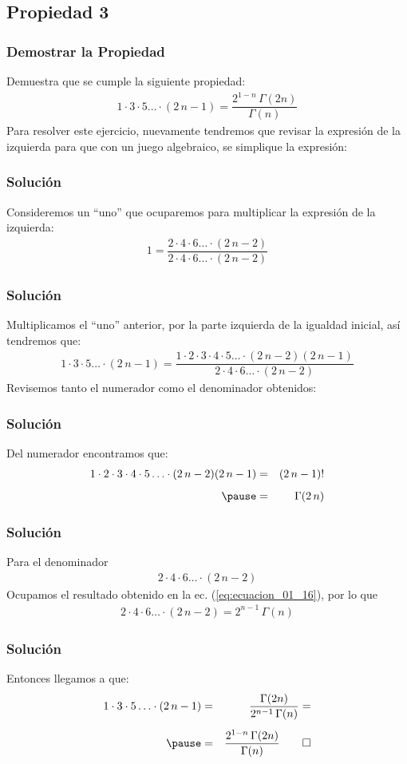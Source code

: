\subsection{Propiedad 3}
\begin{frame}
\frametitle{Demostrar la Propiedad}
Demuestra que se cumple la siguiente propiedad:
\begin{align*}
1 \cdot 3 \cdot 5 \ldots \cdot (2 \, n - 1) = \dfrac{2^{1-n} \, \Gamma (2 n)}{\Gamma (n)}
\end{align*}
\pause
Para resolver este ejercicio, nuevamente tendremos que revisar la expresión de la izquierda para que con un juego algebraico, se simplique la expresión:
\end{frame}
\begin{frame}
\frametitle{Solución}
Consideremos un \enquote{uno} que ocuparemos para multiplicar la expresión de la izquierda:
\begin{align*}
1 = \dfrac{ 2 \cdot 4 \cdot 6 \ldots \cdot (2 \, n - 2)}{ 2 \cdot 4 \cdot 6 \ldots \cdot (2 \, n - 2)}
\end{align*}
\end{frame}
\begin{frame}
\frametitle{Solución}
Multiplicamos el \enquote{uno} anterior, por la parte izquierda de la igualdad inicial, así tendremos que:
{\fontsize{12}{12}\selectfont
\begin{align*}
1 \cdot 3 \cdot 5 \ldots \cdot (2 \, n - 1) = \dfrac{1 \cdot 2 \cdot 3 \cdot 4 \cdot 5 \ldots \cdot (2 \, n - 2)(2 \, n -1)}{2 \cdot 4 \cdot 6 \ldots \cdot (2 \, n - 2)}
\end{align*}}
\pause
Revisemos tanto el numerador como el denominador obtenidos:
\end{frame}
\begin{frame}
\frametitle{Solución}
Del numerador encontramos que:
\begin{eqnarray*}
1 \cdot 2 \cdot 3 \cdot 4 \cdot 5 \ldots \cdot (2 \, n - 2)(2 \, n -1) &=& (2 \, n - 1)! \\[0.5em] \pause
&=& \Gamma (2 \, n)
\end{eqnarray*}
\end{frame}
\begin{frame}
\frametitle{Solución}
Para el denominador
\begin{align*}
2 \cdot 4 \cdot 6 \ldots \cdot (2 \, n - 2)
\end{align*}
\pause
Ocupamos el resultado obtenido en la ec. (\ref{eq:ecuacion_01_16}), por lo que
\begin{align*}
2 \cdot 4 \cdot 6 \ldots \cdot (2 \, n - 2) = 2^{n-1} \, \Gamma (n)
\end{align*}
\end{frame}
\begin{frame}
\frametitle{Solución}
Entonces llegamos a que:
\begin{eqnarray*}
1 \cdot 3 \cdot 5 \ldots \cdot (2 \, n - 1) &=& \dfrac{\Gamma (2 n)}{2^{n-1} \, \Gamma (n)} = \\[0.5em] \pause
&=& \dfrac{2^{1-n} \, \Gamma(2n)}{\Gamma (n)} \qed
\end{eqnarray*}
\end{frame}
